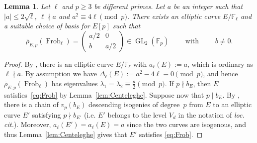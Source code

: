 \documentclass[12pt]{amsart}
\numberwithin{equation}{section}
\newtheorem{lemma}[equation]{Lemma}
\theoremstyle{definition}
\newcommand{\F}{\mathbb{F}}
\newcommand{\rhobar}{{\overline{\rho}}}
\DeclareMathOperator{\GL}{GL}
\DeclareMathOperator{\Frob}{Frob}
\begin{document}
\begin{lemma} \label{lem:diagfrob}
    Let $\ell$ and $p \geq 3$ be different primes. Let $a$ be an integer such that $|a|\leq 2\sqrt{\ell}$, $\ell \nmid a$ and $a^2\equiv4\ell \pmod p$. There exists an elliptic curve $E/\F_\ell$ and a suitable choice of basis for $E[p]$ such that
    \begin{equation}\label{eq:Frob}
    \rhobar_{E,p}(\Frob_\ell)=\left(\begin{smallmatrix}
				 a/2 & 0 \\
				b & a/2\end{smallmatrix}\right) \in \GL_2(\F_p)\qquad \text{ with } \qquad b \neq 0.
    \end{equation}
\end{lemma}
\begin{proof}
    By \cite[Theorem 4.1]{Waterhouse}, there is an elliptic curve $E/\F_\ell$ with $a_\ell(E):=a$, which is ordinary as $\ell \nmid a$. By assumption we have $\Delta_\ell(E):=a^2-4\ell \equiv 0 \pmod p$, and hence $\rhobar_{E,p}(\Frob_\ell)$ has eigenvalues
    $\lambda_1=\lambda_2\equiv\frac{a}{2} \pmod{p}$.
If $p \nmid b_E$, then $E$ satisfies~\eqref{eq:Frob} by Lemma~\ref{lem:Centeleghe}.
            Suppose now that $p\mid b_E$.
            By \cite[Theorem 7]{Drew}, there is a chain of $v_p(b_E)$ descending isogenies of degree~$p$ from $E$ to an elliptic curve $E'$ satisfying $p \nmid b_{E'}$  (i.e. $E'$ belongs to the level $V_d$ in the notation of \textit{loc. cit.}). Moreover, $a_\ell(E')=a_\ell(E)=a$ since the two curves are isogenous, and thus Lemma~\ref{lem:Centeleghe} gives that $E'$ satisfies \eqref{eq:Frob}.
\end{proof}
\end{document}
